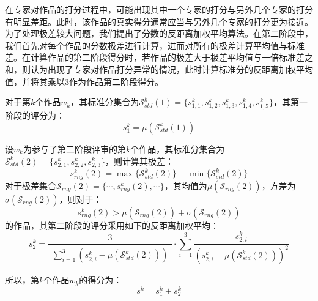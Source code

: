 \documentclass[12pt, onecolumn]{article}
\begin{document}
\begin{enumerate}
		在专家对作品的打分过程中，可能出现其中一个专家的打分与另外几个专家的打分有明显差距。此时，该作品的真实得分通常应当与另外几个专家的打分更为接近。为了处理极差较大问题，我们提出了分数的反距离加权平均算法。在第二阶段中，我们首先对每个作品的分数极差进行计算，进而对所有的极差计算平均值与标准差。在计算作品的第二阶段得分时，若作品的极差大于极差平均值与一倍标准差之和，则认为出现了专家对作品打分异常的情况，此时计算标准分的反距离加权平均值，并将其乘以3作为作品第二阶段得分。
		
		对于第$k$个作品$w_k$，其标准分集合为$\mathcal{S}^k_{std}(1)=\{s^k_{1,1},s^k_{1,2},s^k_{1,3},s^k_{1,4},s^k_{1,5}\}$，其第一阶段的评分为：
		\begin{equation*}
		s^k_1=\mu\left( \mathcal{S}^k_{std}(1)\right) 
		\end{equation*}
		
		设$w_k$为参与了第二阶段评审的第$k$个作品，其标准分集合为$\mathcal{S}^k_{std}(2)=\{s^k_{2,1},s^k_{2,2},s^k_{2,3}\}$，则计算其极差：
		\begin{equation*}
		s_{rng}^k(2)=\max\{\mathcal{S}_{std}^k(2)\}-\min\{\mathcal{S}_{std}^k(2)\}
		\end{equation*}
		对于极差集合$\mathcal{S}_{rng}(2)=\{\cdots,s^k_{rng}(2),\cdots\}$，其均值为$\mu\left( \mathcal{S}_{rng}(2)\right) $，方差为$\sigma\left(\mathcal{S}_{rng}(2) \right) $，则对于：
		\begin{equation*}
		s^k_{rng}(2)>\mu\left( \mathcal{S}_{rng}(2)\right)+\sigma\left(\mathcal{S}_{rng}(2) \right)
		\end{equation*}
		的作品，其第二阶段的评分采用如下的反距离加权平均：
		\begin{equation*}
		s^k_2=\frac{3}{\begin{aligned}
			\sum_{i=1}^{3}\left( s^k_{2,i}-\mu\left(\mathcal{S}^k_{std}(2) \right)\right) 
			\end{aligned}}
		\cdot\sum_{i=1}^{3}\frac{s^k_{2,i}}{\left( s^k_{2,i}-\mu\left(\mathcal{S}^k_{std}(2) \right) \right) ^2} 
		\end{equation*}
		\end{enumerate}
	
		所以，第$k$个作品$w_k$的得分为：
		\begin{equation*}
		s^k=s^k_1+s^k_2
		\end{equation*}
	
\end{document}
